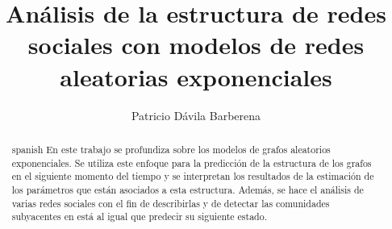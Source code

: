 \documentclass[12pt]{tesisITAM}
\title{Análisis de la estructura de redes sociales con modelos de redes aleatorias exponenciales}
\author{Patricio Dávila Barberena}
\begin{document}
	\maketitle
	\publicationrights
    
    \cleardoublepage
    


	\begin{abstract}{spanish}
	En este trabajo se profundiza sobre los modelos de grafos aleatorios exponenciales. Se utiliza este enfoque para la predicción de la estructura de los grafos en el siguiente momento del tiempo y se interpretan los resultados de la estimación de los parámetros que están asociados a esta estructura. Además, se hace el análisis de varias redes sociales con el fin de describirlas y de detectar las comunidades subyacentes en está al igual que predecir su siguiente estado.
	\end{abstract}
  

    \cleardoublepage
	\setcounter{page}{1}

	\tableofcontents
    
	\cleardoublepage
	\listoffigures
	\newpage
    

	\cleardoublepage
	\setcounter{page}{1}

    
    
    
    \cleardoublepage
    
    
    
    
    \cleardoublepage
    
    
\end{document}
